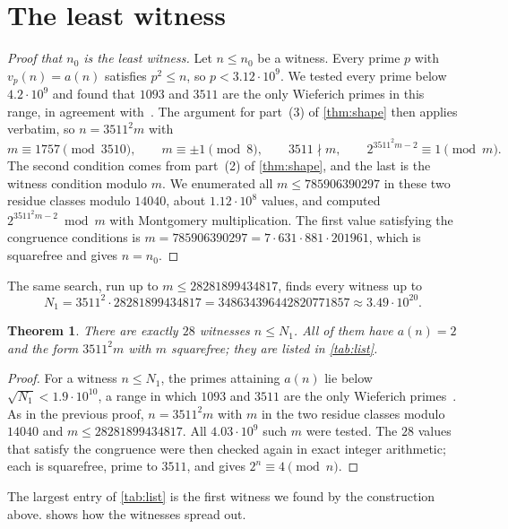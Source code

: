 \documentclass[11pt]{amsart}
\newtheorem{theorem}{Theorem}
\theoremstyle{remark}
\newcommand{\vp}{v_p}
\newcommand{\nO}{n_0}
\begin{document}
\section{The least witness}\label{sec:least}

\begin{proof}[Proof that $\nO$ is the least witness]
Let $n\le\nO$ be a witness. Every prime $p$ with $\vp(n)=a(n)$ satisfies $p^{2}\le n$, so
$p<3.12\cdot 10^{9}$. We tested every prime below $4.2\cdot10^{9}$ and found that
$1093$ and $3511$ are the only Wieferich primes in this range, in agreement
with~\cite{lehmer81,cdp}. The argument for part~(3) of \cref{thm:shape} then applies
verbatim, so $n=3511^{2}m$ with
\[
m\equiv1757\pmod{3510},\qquad m\equiv\pm1\pmod 8,\qquad 3511\nmid m,\qquad
2^{3511^{2}m-2}\equiv1\pmod m .
\]
The second condition comes from part~(2) of \cref{thm:shape}, and the last is the witness
condition modulo $m$. We enumerated all $m\le 785906390297$ in these two residue classes
modulo $14040$, about $1.12\cdot 10^{8}$ values, and computed $2^{3511^{2}m-2}\bmod m$ with
Montgomery multiplication. The first value satisfying the congruence conditions is
$m=785906390297=7\cdot631\cdot881\cdot201961$, which is squarefree and gives $n=\nO$.
\end{proof}

The same search, run up to $m\le 28281899434817$, finds every witness up to
\[
N_1=3511^{2}\cdot 28281899434817=348634396442820771857\approx 3.49\cdot10^{20}.
\]

\begin{theorem}\label{thm:list}
There are exactly $28$ witnesses $n\le N_1$. All of them have $a(n)=2$ and the form
$3511^{2}m$ with $m$ squarefree; they are listed in \cref{tab:list}.
\end{theorem}

\begin{proof}
For a witness $n\le N_1$, the primes attaining $a(n)$ lie below $\sqrt{N_1}<1.9\cdot10^{10}$,
a range in which $1093$ and $3511$ are the only Wieferich primes~\cite{cdp}. As in the
previous proof, $n=3511^{2}m$ with $m$ in the two residue classes modulo $14040$ and
$m\le 28281899434817$. All $4.03\cdot10^{9}$ such $m$ were tested. The $28$ values that
satisfy the congruence were then checked again in exact integer arithmetic; each is
squarefree, prime to $3511$, and gives $2^{n}\equiv4\pmod n$.
\end{proof}

The largest entry of \cref{tab:list} is the first witness we found by the construction above.
 shows how the witnesses spread out.
\end{document}

